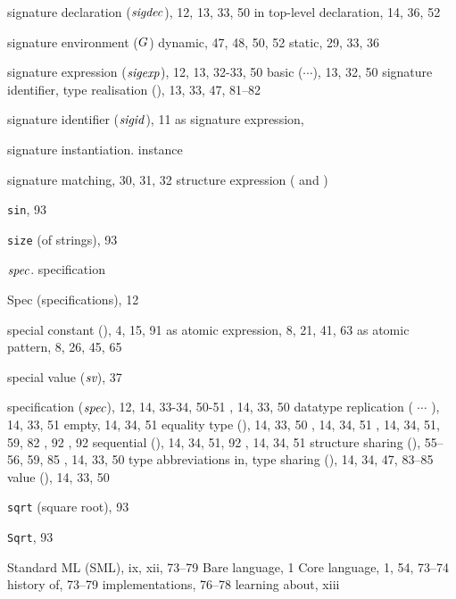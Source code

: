 \begin{theindex}
\item signature declaration (${\it sigdec}$), 12, 13, 33, 50
\subitem in top-level declaration, 14, 36, 52
\item signature environment ($G$) 
\subitem dynamic, 47, 48, 50, 52
\subitem static, 29, 33, 36
\item signature expression (${\it sigexp}$), 12, 13, 32-33, 50
\subitem basic ($\cdots$), 13, 32, 50
\subitem signature identifier, \sigidrefs
\subitem type realisation (), 13, 33, 47, 81--82
\item signature identifier (${\it sigid}$), 11
\subitem as signature expression, \sigidrefs
\item signature instantiation. \see instance 
\item signature matching, 30, 31, 32
\subitem \seealso structure expression (\boxml{:} and \boxml{:>})
\item {\tt sin}, 93
\item {\tt size} (of strings), 93
\item ${\it spec}$. \see specification
\item Spec (specifications), 12
\item special constant (\scon), 4, 15, 91
\subitem as atomic expression, 8, 21, 41, 63
\subitem as atomic pattern, 8, 26, 45, 65
\item special value ($\mbox{\it sv}$), 37
\item specification (${\it spec}$), 12, 14, 33-34, 50-51
\subitem {}, 14, 33, 50
\subitem datatype replication ( $\cdots$ \linebreak
{}), 14, 33, 51
\subitem empty, 14, 34, 51
\subitem equality type (), 14, 33, 50
\subitem {}, 14, 34, 51
\subitem {}, 14, 34, 51, 59, 82
\subitem {}, 92
\subitem {}, 92
\subitem sequential (\boxml{;}), 14, 34, 51, 92
\subitem {}, 14, 34, 51
\subitem structure sharing (), 55--56, 59, 85
\subitem {}, 14, 33, 50
\subitem type abbreviations in, \typabbrinsigsrefs
\subitem type sharing (), 14, 34, 47, 83--85
\subitem value (), 14, 33, 50
\item {\tt sqrt} (square root), 93
\item {\tt Sqrt}, 93
\item Standard ML (SML), ix, xii, 73--79
\subitem Bare language, 1
\subitem Core language, 1, 54, 73--74
\subitem history of, 73--79
\subitem implementations, 76--78
\subitem learning about, xiii

\end{theindex}
